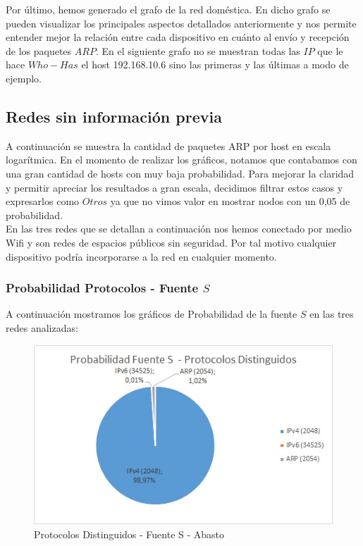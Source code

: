 Por último, hemos generado el grafo de la red doméstica. En dicho grafo se pueden visualizar los principales aspectos 
detallados anteriormente y nos permite entender mejor la relación entre cada dispositivo en cuánto al envío y recepción de los paquetes $ARP$.
En el siguiente grafo no se muestran todas las $IP$ que le hace $Who-Has$ el host 192.168.10.6 sino las primeras y las últimas a modo de ejemplo.


\subsection{Redes sin información previa}
A continuación se muestra la cantidad de paquetes ARP por host en escala logarítmica. 
En el momento de realizar los gráficos, notamos que contabamos con una gran cantidad de hosts con muy baja probabilidad. 
Para mejorar la claridad y permitir apreciar los resultados a gran escala, decidimos filtrar estos casos y expresarlos como $Otros$ ya que 
no vimos valor en mostrar nodos con un 0,05 de probabilidad.\\

En las tres redes que se detallan a continuación nos hemos conectado por medio Wifi y son redes de espacios públicos sin seguridad. 
Por tal motivo cualquier dispositivo podría incorporarse a la red en cualquier momento.\\

\subsubsection{Probabilidad Protocolos - Fuente $S$}
A continuación mostramos los gráficos de Probabilidad de la fuente $S$ en las tres redes analizadas:

\begin{figure}[h!]
\centering
\includegraphics[scale=0.7]{./img/probaS_abasto.jpg}
\caption{Protocolos Distinguidos - Fuente S - Abasto}
\end{figure}

